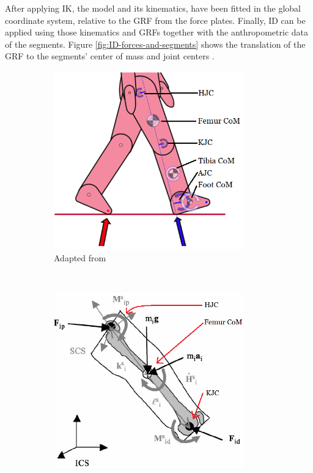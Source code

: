 \documentclass[../main.tex]{subfiles}
\begin{document}
After applying \ac{IK}, the model and its kinematics, have been fitted in the global coordinate system, relative to the \ac{GRF} from the force plates.
Finally, \ac{ID} can be applied using those kinematics and \acp{GRF} together with the anthropometric data of the segments.
Figure \ref{fig:ID-forces-and-segments} shows the translation of the \ac{GRF} to the segments' center of mass and joint centers \cite{cgm-ID, Dumas2004}.
\begin{figure}[!htb]
    \centering
    \begin{subfigure}[t]{0.45\textwidth}
        \centering
        \includegraphics[width=0.9\textwidth]{img/ID_CGM2_labeled.png}
        \caption{Adapted from \cite{cgm-ID}}
        \label{fig:cgm-ID-force-prop}
    \end{subfigure}
    ~
    \begin{subfigure}[t]{0.45\textwidth}
        \centering
        \includegraphics[width=0.9\textwidth]{img/Conventional_ID_labeled.png}

\end{subfigure}
\end{figure}
\end{document}

